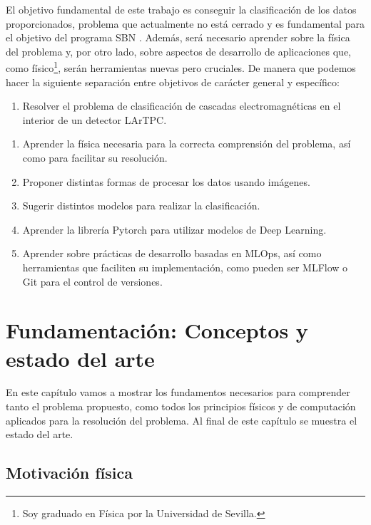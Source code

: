 \documentclass[a4paper,12pt,oneside,titlepage]{book}
\begin{document}
El objetivo fundamental de este trabajo es conseguir la clasificación de los datos proporcionados, problema que actualmente no está cerrado y es fundamental para el objetivo del programa SBN \cite{sbnd}. Además, será necesario aprender sobre la física del problema y, por otro lado, sobre aspectos de desarrollo de aplicaciones que, como físico\footnote{Soy graduado en Física por la Universidad de Sevilla.}, serán herramientas nuevas pero cruciales. De manera que podemos hacer la siguiente separación entre objetivos de carácter general y específico:

\begin{enumerate} [label=(O.G. \arabic*)]
  \item Resolver el problema de clasificación de cascadas electromagnéticas en el interior de un detector LArTPC.
\end{enumerate}

\begin{enumerate}[label=(O.E. \alph*)]
  \item Aprender la física necesaria para la correcta comprensión del problema, así como para facilitar su resolución.
  \item Proponer distintas formas de procesar los datos usando imágenes.
  \item Sugerir distintos modelos para realizar la clasificación.
  \item Aprender la librería Pytorch para utilizar modelos de Deep Learning.
  \item Aprender sobre prácticas de desarrollo basadas en MLOps, así como herramientas que faciliten su implementación, como pueden ser MLFlow o Git para el control de versiones.
\end{enumerate}

\chapter{Fundamentación: Conceptos y estado del arte}

En este capítulo vamos a mostrar los fundamentos necesarios para comprender tanto el problema propuesto, como todos los principios físicos y de computación aplicados para la resolución del problema. Al final de este capítulo se muestra el estado del arte. %

\section{Motivación física}
\label{sec:conceptos}
\end{document}

